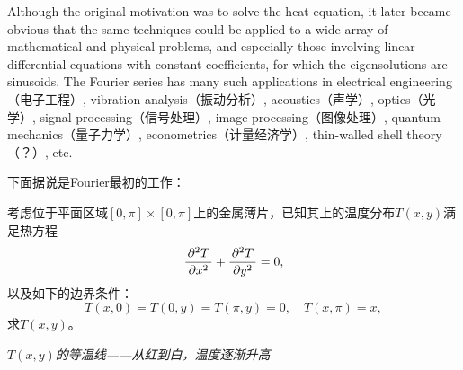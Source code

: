 \begin{shaded}
{		Although the original motivation was to solve the heat equation, 
		it later became obvious that the same techniques could be applied 
		to a wide array of mathematical and physical problems, and 
		especially those involving linear differential equations with 
		constant coefficients, for which the eigensolutions are sinusoids. 
		The Fourier series has many such applications in electrical 
		engineering（电子工程）, vibration analysis（振动分析）, acoustics（声学）, 
		optics（光学）, signal processing（信号处理）, image processing（图像处理）, 
		quantum mechanics（量子力学）, econometrics（计量经济学）, 
		thin-walled shell theory（？）, etc.
	}
	
	下面据说是Fourier最初的工作：
	
	考虑位于平面区域$[0,\pi]\times[0,\pi]$上的金属薄片，已知其上的温度分布$T(x,y)$满足热方程
	$$\displaystyle\frac{\,{\partial^2T}\,}{\,{\partial x^2}\,}+\displaystyle\frac{\,{\partial^2T}\,}{\,{\partial y^2}\,}=0,$$
	以及如下的边界条件：
	$$T(x,0)=T(0,y)=T(\pi,y)=0,\quad T(x,\pi)=x,$$
	求$T(x,y)$。
	
	\begin{center}
		
		{\it $T(x,y)$的等温线——从红到白，温度逐渐升高}
	\end{center}
	

\end{shaded}
